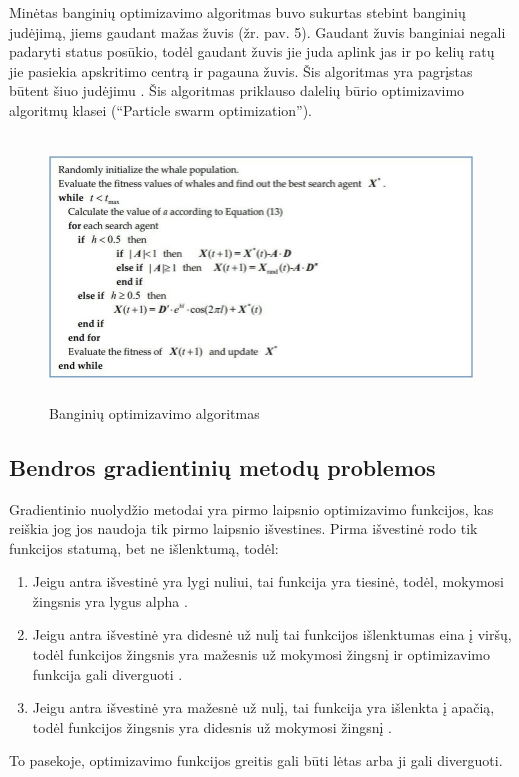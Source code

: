 \documentclass{VUMIFInfKursinis}
\begin{document}
\par
Minėtas banginių optimizavimo algoritmas buvo sukurtas stebint banginių judėjimą, jiems gaudant mažas žuvis (žr. pav. 5). Gaudant žuvis banginiai negali
padaryti status posūkio, todėl gaudant žuvis jie juda aplink jas ir po kelių ratų jie pasiekia apskritimo
centrą ir pagauna žuvis. Šis algoritmas yra pagrįstas būtent šiuo judėjimu \cite{salt10}. Šis algoritmas priklauso dalelių būrio optimizavimo algoritmų klasei (\enquote{Particle swarm optimization}).
\begin{figure}[ht]
  \centering
  \includegraphics[width=12cm,height=7cm,keepaspectratio]{what_alg.png}
  \caption{Banginių optimizavimo algoritmas \cite{salt10}}
  \label{fig:lygtis1}
\end{figure}

\subsection{Bendros gradientinių metodų problemos}
\par
Gradientinio nuolydžio metodai yra pirmo laipsnio optimizavimo funkcijos, kas
reiškia jog jos naudoja tik pirmo laipsnio išvestines. Pirma išvestinė rodo
tik funkcijos statumą, bet ne išlenktumą, todėl:
\begin{enumerate}
\item Jeigu antra išvestinė yra lygi nuliui, tai funkcija yra tiesinė, todėl,
mokymosi žingsnis yra lygus alpha \cite{salt9}.
\item Jeigu antra išvestinė yra didesnė už nulį tai funkcijos išlenktumas eina į viršų,
todėl funkcijos žingsnis yra mažesnis už mokymosi žingsnį ir optimizavimo funkcija gali
diverguoti \cite{salt9}.
\item Jeigu antra išvestinė yra mažesnė už nulį, tai funkcija yra išlenkta į apačią,
todėl funkcijos žingsnis yra didesnis už mokymosi žingsnį \cite{salt9}.
\end{enumerate}
\par
To pasekoje, optimizavimo funkcijos greitis gali būti lėtas arba ji gali diverguoti.
\end{document}
